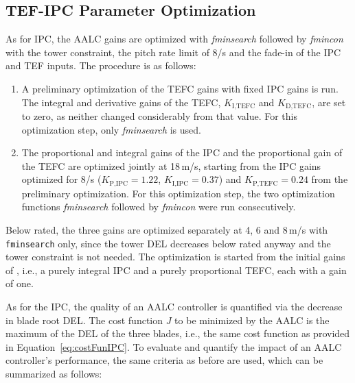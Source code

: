 \subsection{TEF-IPC Parameter Optimization} \label{sec:ControllerParameterOptimization}
As for IPC, the AALC gains are optimized with \textit{fminsearch} followed by \textit{fmincon} with the tower constraint, the pitch rate limit of 8\textdegree/s and the fade-in of the IPC and TEF inputs. The procedure is as follows:
\begin{enumerate}
    \item A preliminary optimization of the TEFC gains with fixed IPC gains is run. The integral and derivative gains of the TEFC, $K_{\text{I,TEFC}}$ and $K_{\text{D,TEFC}}$, are set to zero, as neither changed considerably from that value. For this optimization step, only \textit{fminsearch} is used.
    \item The proportional and integral gains of the IPC and the proportional gain of the TEFC are optimized jointly at 18\,m/s, starting from the IPC gains optimized for 8\textdegree/s ($K_{\text{P,IPC}} = 1.22$, $K_{\text{I,IPC}} = 0.37$) and $K_{\text{P,TEFC}} = 0.24$ from the preliminary optimization. For this optimization step, the two optimization functions \textit{fminsearch} followed by \textit{fmincon} were run consecutively.
\end{enumerate}
Below rated, the three gains are optimized separately at 4, 6 and 8\,m/s with \texttt{fminsearch} only, since the tower DEL decreases below rated anyway and the tower constraint is not needed. The optimization is started from the initial gains of \cite{dittmer2024combined}, i.e., a purely integral IPC and a purely proportional TEFC, each with a gain of one.

As for the IPC, the quality of an AALC controller is quantified via the decrease in blade root DEL. The cost function $J$ to be minimized by the AALC is the maximum of the DEL of the three blades, i.e., the same cost function as provided in Equation~\eqref{eq:costFunIPC}.
To evaluate and quantify the impact of an AALC controller's performance, the same criteria as before are used, which can be summarized as follows:

